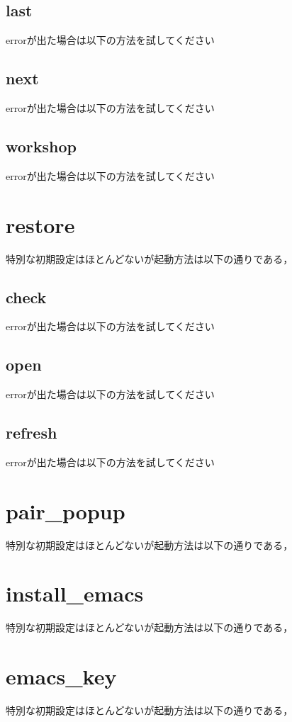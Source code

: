\subsection{last}\label{last}
errorが出た場合は以下の方法を試してください

\subsection{next}\label{next}
errorが出た場合は以下の方法を試してください

\subsection{workshop}\label{workshop}
errorが出た場合は以下の方法を試してください

\section{restore}\label{restore}
特別な初期設定はほとんどないが起動方法は以下の通りである，

\subsection{check}\label{check}
errorが出た場合は以下の方法を試してください

\subsection{open}\label{open}
errorが出た場合は以下の方法を試してください

\subsection{refresh}\label{refresh}
errorが出た場合は以下の方法を試してください

\section{pair\_popup}\label{pair_popup}
特別な初期設定はほとんどないが起動方法は以下の通りである，

\section{install\_emacs}\label{install_emacs}
特別な初期設定はほとんどないが起動方法は以下の通りである，

\section{emacs\_key}\label{emacs_key}
特別な初期設定はほとんどないが起動方法は以下の通りである，

